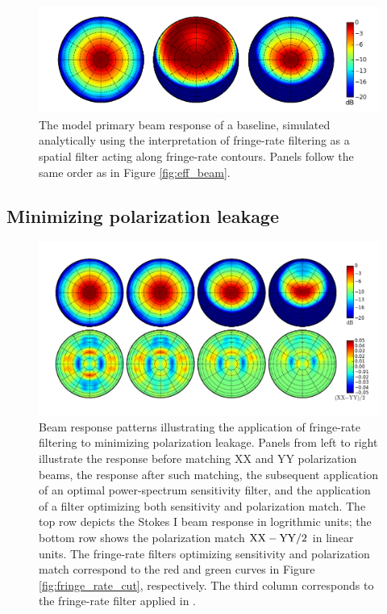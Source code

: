\documentclass[twocolumn,apj,numberedappendix]{emulateapj}
\begin{document}
\begin{figure}\centering
\includegraphics[width=1.9\columnwidth]{plots/sim_beam.png}
\caption{
The model primary beam response of a baseline, simulated analytically using the interpretation
of fringe-rate filtering as a spatial filter acting along fringe-rate contours.  Panels follow
the same order as in Figure \ref{fig:eff_beam}.
}\label{fig:sim_beam}
\end{figure}

\subsection{Minimizing polarization leakage}
\label{sec:polbeams}
\def\VXX{{V_{\rm XX}}}
\def\VYY{{V_{\rm YY}}}
\def\VI{{V_{\rm I}}}
\def\VQ{{V_{\rm Q}}}

\begin{figure}\centering
\includegraphics[width=1.9\columnwidth]{plots/pol_match.png}
\caption{
Beam response patterns illustrating the application of fringe-rate filtering to minimizing polarization leakage.
Panels from left to right illustrate the
response before matching XX and YY polarization beams, the response after such matching, 
the subsequent application of an optimal power-spectrum sensitivity filter, and the
application of a filter optimizing both sensitivity and polarization match.
The top row depicts the Stokes I beam response in logrithmic units; the
bottom row shows the polarization match ${\rm XX-YY}/2$ in linear units.
The fringe-rate filters optimizing sensitivity and polarization match correspond
to the red and green curves in Figure \ref{fig:fringe_rate_cut}, respectively.
The third column corresponds to the fringe-rate filter applied in \citet{ali_et_al2015}.
}\label{fig:pol_match}
\end{figure}
\end{document}
